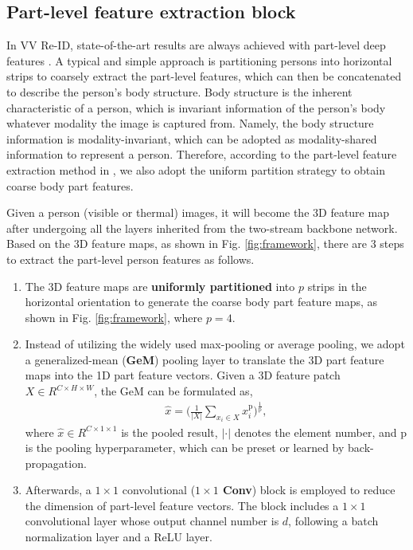 \documentclass[journal]{IEEEtran}
\begin{document}
\subsection{Part-level feature extraction block}
In VV Re-ID, state-of-the-art results are always achieved with part-level deep features \cite{Yang2020PPU,Wan2020CLPD}. A typical and simple approach is partitioning persons into horizontal strips to coarsely extract the part-level features, which can then be concatenated to describe the person's body structure. Body structure is the inherent characteristic of a person, which is invariant information of the person's body whatever modality the image is captured from. Namely, the body structure information is modality-invariant, which can be adopted as modality-shared information to represent a person.
Therefore, according to the part-level feature extraction method in \cite{sun2018beyond,wang2018learning}, we also adopt the uniform partition strategy to obtain coarse body part features.

Given a person (visible or thermal) images, it will become the 3D feature map after undergoing all the layers inherited from the two-stream backbone network. Based on the 3D feature maps, as shown in Fig. \ref{fig:framework}, there are 3 steps to extract the part-level person features as follows.
\begin{enumerate}
  \item The 3D feature maps are \textbf{uniformly partitioned} into $p$ strips in the horizontal orientation to generate the coarse body part feature maps, as shown in Fig. \ref{fig:framework}, where $p=4$.
  \item Instead of utilizing the widely used max-pooling or average pooling, we adopt a generalized-mean (\textbf{GeM}) \cite{radenovic2018fine} pooling layer to translate the 3D part feature maps into the 1D part feature vectors. Given a 3D feature patch $X \in R^{C \times H \times W}$, the GeM can be formulated as,
      \begin{align}
        \hat{x} = \big(\frac{1}{|X|}\sum_{x_{i}\in X} x_{i}^{\textrm{p}} \big)^{\frac{1}{\textrm{p}}},
      \end{align}
      where $\hat{x} \in R^{C \times 1 \times 1}$ is the pooled result, $|\cdot|$ denotes the element number, and $\textrm{p}$ is the pooling hyperparameter, which can be preset or learned by back-propagation.
\item Afterwards, a $1 \times 1$ convolutional (\textbf{$1 \times 1$ Conv}) block is employed to reduce the dimension of part-level feature vectors. The block includes a $1 \times 1$ convolutional layer whose output channel number is $d$, following a batch normalization layer and a ReLU layer.
\end{enumerate}
\end{document}
